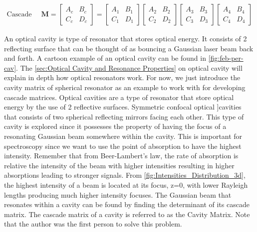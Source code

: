 \documentclass[11pt,a4paper]{book}
\begin{document}
		\begin{equation}
		\label{eq:Cascade Matrices}
		\begin{split}
		\text{Cascade Matrix: } & \textbf{M} = 		\begin{bmatrix}
		A_c & B_c \\
		C_c & D_c  
		\end{bmatrix} 
		=
		\begin{bmatrix}
		A_1 & B_1 \\
		C_1 & D_1  
		\end{bmatrix}
		\begin{bmatrix}
		A_2 & B_2 \\
		C_2 & D_2  
		\end{bmatrix}
		\begin{bmatrix}
		A_3 & B_3 \\
		C_3 & D_3  
		\end{bmatrix}
		\begin{bmatrix}
		A_4 & B_4 \\
		C_4 & D_4  
		\end{bmatrix}
		\end{split}
		\end{equation}
		
		An optical cavity is type of resonator that stores optical energy. It consists of 2 reflecting surface that can be thought of as bouncing a Gaussian laser beam back and forth. A cartoon example of an optical cavity can be found in \autoref{fig:feb-per-cav}. The \autoref{sec:Optical Cavity and Resonance Properties} on optical cavity will explain in depth how optical resonators work. For now, we just introduce the cavity matrix of spherical resonator as an example to work with for developing cascade matrices. Optical cavities are a type of resonator that store optical energy by the use of 2 reflective surfaces. Symmetric confocal optical ]cavities that consists of two spherical reflecting mirrors facing each other. This type of cavity is explored since it possesses the property of having the focus of a resonating Gaussian beam somewhere within the cavity. This is important for spectroscopy since we want to use the point of absorption to have the highest intensity. Remember that from Beer-Lambert's law, the rate of absorption is relative the intensity of the beam with higher intensities resulting in higher absorptions leading to stronger signals. From \autoref{fig:Intensities_Distribution_3d}, the highest intensity of a beam is located at its focus, z=0, with lower Rayleigh lengths producing much higher intensity focuses. The Gaussian beam that resonates within a cavity can be found by finding the determinant of its cascade matrix. The cascade matrix of a cavity is referred to as the Cavity Matrix. Note that the author was the first person to solve this problem.
		
\end{document}
